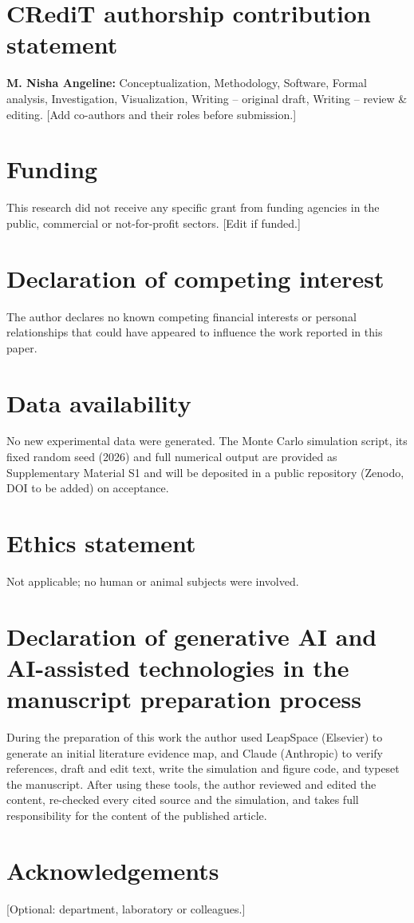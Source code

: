 \documentclass[preprint,review,12pt,authoryear]{elsarticle}
\begin{document}
\section*{CRediT authorship contribution statement}
\textbf{M. Nisha Angeline:} Conceptualization, Methodology, Software, Formal analysis, Investigation, Visualization, Writing -- original draft, Writing -- review \& editing. [Add co-authors and their roles before submission.]

\section*{Funding}
This research did not receive any specific grant from funding agencies in the public, commercial or not-for-profit sectors. [Edit if funded.]

\section*{Declaration of competing interest}
The author declares no known competing financial interests or personal relationships that could have appeared to influence the work reported in this paper.

\section*{Data availability}
No new experimental data were generated. The Monte Carlo simulation script, its fixed random seed (2026) and full numerical output are provided as Supplementary Material S1 and will be deposited in a public repository (Zenodo, DOI to be added) on acceptance.

\section*{Ethics statement}
Not applicable; no human or animal subjects were involved.

\section*{Declaration of generative AI and AI-assisted technologies in the manuscript preparation process}
During the preparation of this work the author used LeapSpace (Elsevier) to generate an initial literature evidence map, and Claude (Anthropic) to verify references, draft and edit text, write the simulation and figure code, and typeset the manuscript. After using these tools, the author reviewed and edited the content, re-checked every cited source and the simulation, and takes full responsibility for the content of the published article.

\section*{Acknowledgements}
[Optional: department, laboratory or colleagues.]



\end{document}
